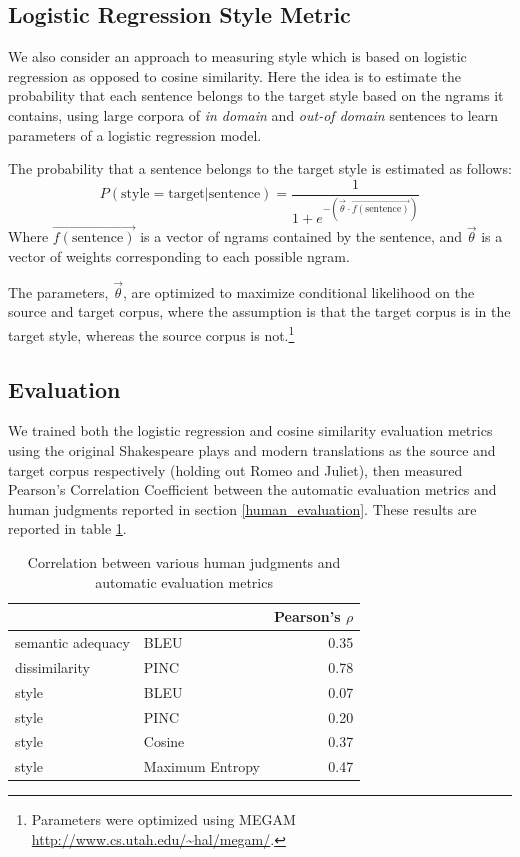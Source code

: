 \documentclass[10pt,a5paper,twoside]{article}
\begin{document}
\subsection{Logistic Regression Style Metric}
We also consider an approach to measuring style which is based on logistic regression as opposed to cosine similarity.
Here the idea is to estimate the probability that each
sentence belongs to the target style based on the ngrams it contains, using large corpora of \emph{in domain} and \emph{out-of domain} sentences to learn  parameters of a logistic regression model.

The probability that a sentence belongs to the target style is estimated as follows:
\[
P(\text{style} = \text{target}|\text{sentence}) = \frac{1}{1 + e^{-\left( \vec{\theta} \cdot \vec{f(\text{sentence})} \right)}}
\]
Where $\vec{f(\text{sentence})}$ is a vector of ngrams contained by the sentence, and $\vec{\theta}$ is a vector of weights corresponding to each possible ngram.

The parameters, $\vec{\theta}$, are optimized to maximize conditional likelihood on the source and target corpus, where the assumption is that the target corpus
is in the target style, whereas the source corpus is not.\footnote{
  Parameters were optimized using MEGAM \url{http://www.cs.utah.edu/~hal/megam/}.
}

\subsection{Evaluation}
We trained both the logistic regression and cosine similarity evaluation metrics using the original Shakespeare plays and modern translations as
the source and target corpus respectively (holding out Romeo and Juliet), then measured Pearson's Correlation Coefficient between the automatic
evaluation metrics and human judgments reported in section \ref{human_evaluation}.  These results are reported in table \ref{correlation}.

\begin{table}
  \begin{center}
  \begin{tabular}{|l|l|r|}
    \hline
    & & Pearson's $\rho$ \\
    \hline
    \hline
    semantic adequacy & BLEU & 0.35 \\
    \hline
    dissimilarity & PINC & 0.78 \\
    \hline
    style & BLEU & 0.07 \\
    \hline
    style & PINC & 0.20 \\
    \hline
    style & Cosine & 0.37 \\
    \hline
    style & Maximum Entropy & 0.47 \\
    \hline
  \end{tabular}
  \end{center}
  \caption{Correlation between various human judgments and automatic evaluation metrics}
  \label{correlation}
\end{table}
\end{document}
